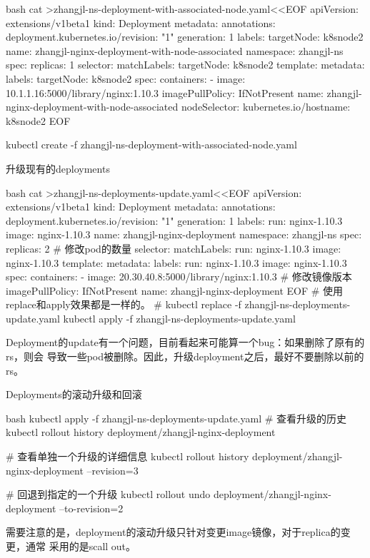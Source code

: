 \begin{outline}[enumerate]
\begin{code-block}{bash}
cat >zhangjl-ns-deployment-with-associated-node.yaml<<EOF
apiVersion: extensions/v1beta1
kind: Deployment
metadata:
  annotations:
    deployment.kubernetes.io/revision: "1"
  generation: 1
  labels:
    targetNode: k8snode2
  name: zhangjl-nginx-deployment-with-node-associated
  namespace: zhangjl-ns
spec:
  replicas: 1
  selector:
    matchLabels:
      targetNode: k8snode2
  template:
    metadata:
      labels:
        targetNode: k8snode2
    spec:
      containers:
      - image: 10.1.1.16:5000/library/nginx:1.10.3
        imagePullPolicy: IfNotPresent
        name: zhangjl-nginx-deployment-with-node-associated
      nodeSelector:
        kubernetes.io/hostname: k8snode2
EOF

kubectl create -f zhangjl-ns-deployment-with-associated-node.yaml
\end{code-block}

\1 升级现有的deployments
\begin{code-block}{bash}
cat >zhangjl-ns-deployments-update.yaml<<EOF
apiVersion: extensions/v1beta1
kind: Deployment
metadata:
  annotations:
    deployment.kubernetes.io/revision: "1"
  generation: 1
  labels:
    run: nginx-1.10.3
    image: nginx-1.10.3
  name: zhangjl-nginx-deployment
  namespace: zhangjl-ns
spec:
  replicas: 2 # 修改pod的数量
  selector:
    matchLabels:
      run: nginx-1.10.3
      image: nginx-1.10.3
  template:
    metadata:
      labels:
        run: nginx-1.10.3
        image: nginx-1.10.3
    spec:
      containers:
      - image: 20.30.40.8:5000/library/nginx:1.10.3 # 修改镜像版本
        imagePullPolicy: IfNotPresent
        name: zhangjl-nginx-deployment
EOF
# 使用replace和apply效果都是一样的。
# kubectl replace -f zhangjl-ns-deployments-update.yaml
kubectl apply -f zhangjl-ns-deployments-update.yaml
\end{code-block}
Deployment的update有一个问题，目前看起来可能算一个bug：如果删除了原有的rs，则会
导致一些pod被删除。因此，升级deployment之后，最好不要删除以前的rs。

\1 Deployments的滚动升级和回滚
\begin{code-block}{bash}
kubectl apply -f zhangjl-ns-deployments-update.yaml
# 查看升级的历史
kubectl rollout history deployment/zhangjl-nginx-deployment

# 查看单独一个升级的详细信息
kubectl rollout history deployment/zhangjl-nginx-deployment --revision=3

# 回退到指定的一个升级
kubectl rollout undo deployment/zhangjl-nginx-deployment --to-revision=2
\end{code-block}
需要注意的是，deployment的滚动升级只针对变更image镜像，对于replica的变更，通常
采用的是scall out。


\end{outline}
